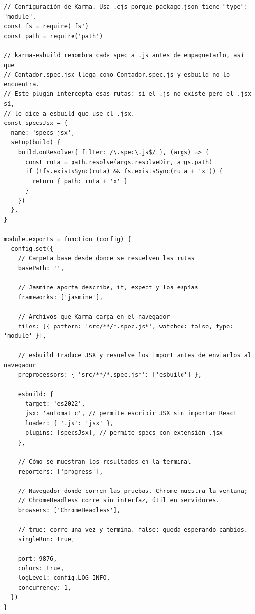 \documentclass[11pt,a4paper]{article}
\begin{document}
\begin{lstlisting}[language=JSX,title={\small\ttfamily karma.conf.cjs}]
// Configuración de Karma. Usa .cjs porque package.json tiene "type": "module".
const fs = require('fs')
const path = require('path')

// karma-esbuild renombra cada spec a .js antes de empaquetarlo, así que
// Contador.spec.jsx llega como Contador.spec.js y esbuild no lo encuentra.
// Este plugin intercepta esas rutas: si el .js no existe pero el .jsx sí,
// le dice a esbuild que use el .jsx.
const specsJsx = {
  name: 'specs-jsx',
  setup(build) {
    build.onResolve({ filter: /\.spec\.js$/ }, (args) => {
      const ruta = path.resolve(args.resolveDir, args.path)
      if (!fs.existsSync(ruta) && fs.existsSync(ruta + 'x')) {
        return { path: ruta + 'x' }
      }
    })
  },
}

module.exports = function (config) {
  config.set({
    // Carpeta base desde donde se resuelven las rutas
    basePath: '',

    // Jasmine aporta describe, it, expect y los espías
    frameworks: ['jasmine'],

    // Archivos que Karma carga en el navegador
    files: [{ pattern: 'src/**/*.spec.js*', watched: false, type: 'module' }],

    // esbuild traduce JSX y resuelve los import antes de enviarlos al navegador
    preprocessors: { 'src/**/*.spec.js*': ['esbuild'] },

    esbuild: {
      target: 'es2022',
      jsx: 'automatic', // permite escribir JSX sin importar React
      loader: { '.js': 'jsx' },
      plugins: [specsJsx], // permite specs con extensión .jsx
    },

    // Cómo se muestran los resultados en la terminal
    reporters: ['progress'],

    // Navegador donde corren las pruebas. Chrome muestra la ventana;
    // ChromeHeadless corre sin interfaz, útil en servidores.
    browsers: ['ChromeHeadless'],

    // true: corre una vez y termina. false: queda esperando cambios.
    singleRun: true,

    port: 9876,
    colors: true,
    logLevel: config.LOG_INFO,
    concurrency: 1,
  })
}
\end{lstlisting}
\end{document}
